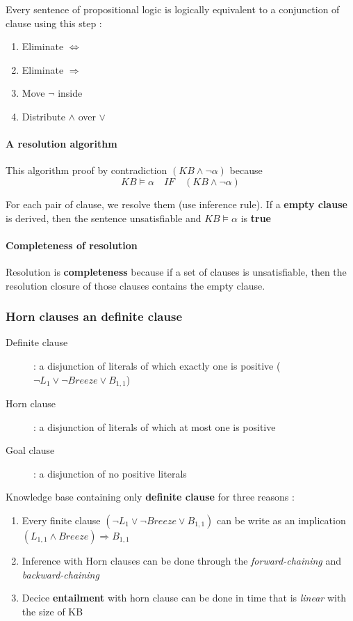 Every sentence of propositional logic is logically equivalent to a conjunction of clause using this step :
\begin{enumerate}
    \item Eliminate $\Leftrightarrow$
    \item Eliminate $\Rightarrow$
    \item Move $\neg$ inside
    \item Distribute $\wedge$ over $\vee$
\end{enumerate}

\paragraph{A resolution algorithm}
This algorithm proof by contradiction $(KB \wedge \neg \alpha)$ because $$KB \models \alpha \quad
 IF \quad (KB \wedge \neg \alpha)$$

For each  pair of  clause, we  resolve them (use  inference rule).  If a
\textbf{empty clause} is derived, then the sentence unsatisfiable and $KB \models \alpha$ 
is \textbf{true}

\paragraph{Completeness of resolution}
Resolution is \textbf{completeness} because if a set of clauses is unsatisfiable, then
the resolution closure of those clauses contains the empty clause.


\subsubsection{Horn clauses an definite clause}
\begin{description}
    \item[Definite clause] : a disjunction of literals of which exactly one is positive 
        ($\neg L_1 \vee \neg Breeze \vee B_{1,1}$)
    \item[Horn clause] : a disjunction of literals of which at most one is positive
    \item[Goal clause ] : a disjunction of no positive literals
\end{description}

Knowledge base containing only \textbf{definite clause} for three reasons :
\begin{enumerate}
    \item Every finite clause $(\neg L_1 \vee \neg Breeze \vee B_{1,1})$ can be write as an 
        implication$(L_{1,1} \wedge Breeze) \Rightarrow B_{1,1}$
    \item Inference with Horn clauses can be done through the \textit{forward-chaining} and 
        \textit{backward-chaining}
    \item Decice \textbf{entailment} with horn clause can be done in time
        that is \textit{linear} with the size of KB
\end{enumerate}

